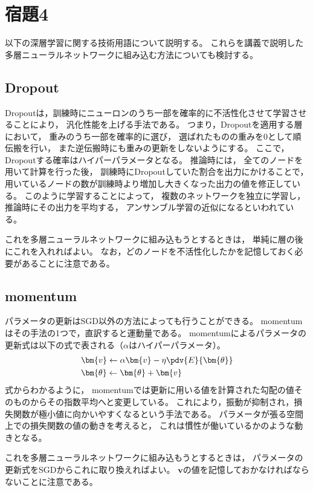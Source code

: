 \documentclass[class=jsarticle, crop=false, dvipdfmx, fleqn]{standalone}
\begin{document}
\section*{宿題4}


以下の深層学習に関する技術用語について説明する。
これらを講義で説明した多層ニューラルネットワークに組み込む方法についても検討する。


\subsection*{Dropout}

Dropoutは，訓練時にニューロンのうち一部を確率的に不活性化させて学習させることにより，
汎化性能を上げる手法である。
つまり，Dropoutを適用する層において，
重みのうち一部を確率的に選び，
選ばれたものの重みを0として順伝搬を行い，
また逆伝搬時にも重みの更新をしないようにする。
ここで，Dropoutする確率はハイパーパラメータとなる。
推論時には，
全てのノードを用いて計算を行った後，
訓練時にDropoutしていた割合を出力にかけることで，
用いているノードの数が訓練時より増加し大きくなった出力の値を修正している。
このように学習することによって，
複数のネットワークを独立に学習し，
推論時にその出力を平均する，
アンサンブル学習の近似になるといわれている。

これを多層ニューラルネットワークに組み込もうとするときは，
単純に層の後にこれを入れればよい。
なお，どのノードを不活性化したかを記憶しておく必要があることに注意である。



\subsection*{momentum}

パラメータの更新はSGD以外の方法によっても行うことができる。
momentumはその手法の1つで，直訳すると運動量である。
momentumによるパラメータの更新式は以下の式で表される（$\alpha$はハイパーパラメータ）。
\begin{align}
    & \bm{v} \leftarrow \alpha \bm{v} - \eta \pdv{E}{\bm{\theta}} \\
    & \bm{\theta} \leftarrow \bm{\theta} + \bm{v}
\end{align}
式からわかるように，
momentumでは更新に用いる値を計算された勾配の値そのものからその指数平均へと変更している。
これにより，振動が抑制され，損失関数が極小値に向かいやすくなるという手法である。
パラメータが張る空間上での損失関数の値の動きを考えると，
これは慣性が働いているかのような動きとなる。

これを多層ニューラルネットワークに組み込もうとするときは，
パラメータの更新式をSGDからこれに取り換えればよい。
\(\bm{v}\)の値を記憶しておかなければならないことに注意である。
\end{document}
